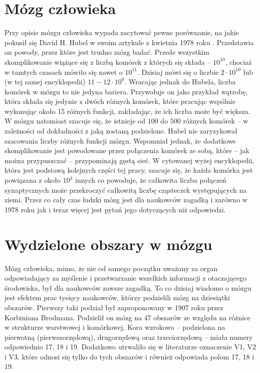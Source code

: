 \section{Mózg człowieka}
\label{mozg}
%
%
Przy opisie mózgu człowieka wypada zacytować pewne porównanie, na jakie pokusił się David H. Hubel w swoim artykule z kwietnia 1978 roku \cite{Hubel1978}. Przedstawia on powody, przez które jest trudno mózg badać. Przede wszystkim skomplikowanie wiążące się z liczbą komórek z których się składa -- $10^{10}$, chociaż w tamtych czasach mówiło się nawet o $10^{11}$. Dzisiaj mówi się o liczbie $2 \cdot 10^{10}$ \cite{encyclopedia} lub (w tej samej encyklopedii) $11-12 \cdot 10^{9}$. Wracając jednak do Hubela, liczba komórek w mózgu to nie jedyna bariera. Przywołuje on jako przykład wątrobę, która składa się jedynie z dwóch różnych komórek, które pracując wspólnie wykonując około 15 różnych funkcji, zakładając, że ich liczba może być większa. W mózgu natomiast szacuje się, że istnieje od $100$ do $500$ różnych komórek -- w zależności od dokładności z jaką zostaną podzielone. Hubel nie zaryzykował szacowania liczby różnych funkcji mózgu. Wspomniał jednak, że dodatkowe skomplikowanie jest powodowane przez połączenia komórek ze sobą, które -- jak można przypuszczać -- przypominają gęstą sieć. W cytowanej wyżej encyklopedii, która jest podstawą kolejnych części tej pracy, szacuje się, że każda komórka jest powiązana z około $10^4$ innych co powoduje, że całkowita liczba połączeń synaptycznych może przekroczyć całkowitą liczbę cząsteczek występujących na ziemi. Przez co cały czas ludzki mózg jest dla naukowców zagadką i zarówno w 1978 roku jak i teraz więcej jest pytań jego dotyczących niż odpowiedzi.

\section{Wydzielone obszary w mózgu}
\label{obszaryWMozgu}
Mózg człowieka, mimo, że nie od samego początku uważany za organ odpowiadający za myślenie i przetwarzanie wszelkich informacji z otaczającego środowiska, był dla naukowców zawsze zagadką. To co dzisiaj wiadomo o mózgu jest efektem prac tysięcy naukowców, którzy podzielili mózg na dziesiątki obszarów. Pierwszy taki podział był zaproponowany w 1907 roku przez Korbiniana Brodmana. Podzielił on mózg na 47 obszarów \cite{brodmannn} ze względu na różnice w strukturze warstwowej i komórkowej. Kora wzrokowa -- podzielona na pierwotną (pierwszorzędową), drugorzędową oraz trzeciorzędową -- miała numery odpowiednio 17, 18 i 19. Dodatkowo utrwaliło się w literaturze oznaczenie V1, V2 i V3, które odnosi się tylko do tych obszarów i również odpowiada polom 17, 18 i 19.

